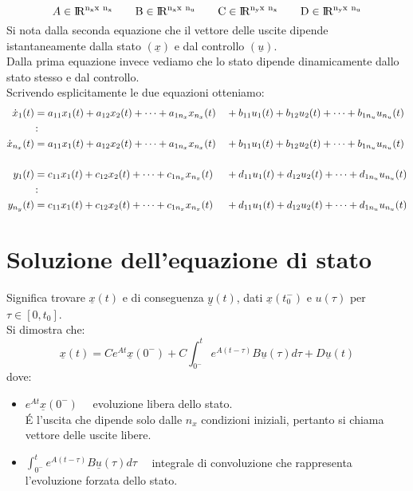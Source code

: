 \documentclass[../main.tex]{subfiles}
\begin{document}
		\[ A \in \R^{n_x x\ n_x} \qquad B \in \R^{n_x x\ n_u} \qquad C \in \R^{n_y x\ n_x} \qquad D \in \R^{n_y x\ n_u} \]
		Si nota dalla seconda equazione che il vettore delle uscite dipende istantaneamente dalla stato $ (\underline x) $ e dal controllo $ (\underline u) $.\\
		Dalla prima equazione invece vediamo che lo stato dipende dinamicamente dallo stato stesso e dal controllo.\\
		\linebreak 
		Scrivendo esplicitamente le due equazioni otteniamo:
		\newcommand{\eq}[2]{#2_{11} #1_1(t) + #2_{12} #1_2(t) + \cdots + #2_{1n_#1} #1_{n_#1}(t)}
		\begin{align*}
			\dot x_1(t) &= \eq{x}{a} && + \eq{u}{b}\\
			&\colon\\
			\dot x_{n_x}(t) &= \eq{x}{a} && + \eq{u}{b}\\
			\smallskip\\
			y_1(t) &= \eq{x}{c} && + \eq{u}{d}\\
			&\colon\\
			y_{n_y}(t) &= \eq{x}{c} && + \eq{u}{d}\\
		\end{align*}
		
	\section{Soluzione dell'equazione di stato}
		Significa trovare $ \underline x(t) $ e di conseguenza $ \underline y(t) $, dati $ \underline x(t_0^-) $ e $ u(\tau) $ per $ \tau \in [0, t_0] $.\\
		Si dimostra che:
		\[ \underline x(t) = C e^{At} \underline x(0^-) + C \int_{0^-}^{t} e^{A(t-\tau)} B \underline u(\tau) d\tau + D \underline u(t) \]
		dove:
		\begin{itemize}
			\item 
				$ e^{At} \underline x(0^-) \quad $ evoluzione libera dello stato.\\
				\'E l'uscita che dipende solo dalle $ n_x $ condizioni iniziali, pertanto si chiama vettore delle uscite libere.
			\item
				$ \int_{0^-}^{t} e^{A(t-\tau)} B \underline u(\tau) d\tau \quad $ integrale di convoluzione che rappresenta l'evoluzione forzata dello stato.
		\end{itemize}
	
\end{document}

